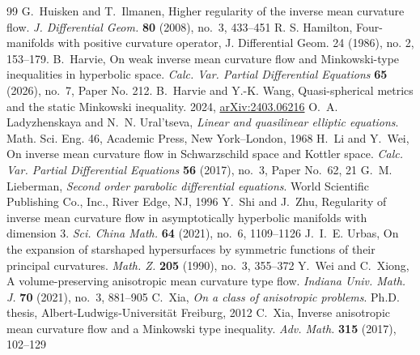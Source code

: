 \documentclass[10pt,a4paper]{amsart}
\providecommand{\arxiv}[1]{\href{https://arxiv.org/abs/#1}{arXiv:#1}}
\numberwithin{equation}{section}
\begin{document}
\begin{thebibliography}{99}
 G.~Huisken and T.~Ilmanen, Higher regularity of the inverse mean curvature flow. \emph{J. Differential Geom.} \textbf{80} (2008), no.~3, 433--451 
 R. S. Hamilton, Four-manifolds with positive curvature operator, J. Differential Geom. 24 (1986), no. 2, 153--179.
 B.~Harvie, On weak inverse mean curvature flow and Minkowski-type inequalities in hyperbolic space. \emph{Calc. Var. Partial Differential Equations} \textbf{65} (2026), no.~7, Paper No. 212.
 B.~Harvie and Y.-K. Wang, Quasi-spherical metrics and the static Minkowski inequality. 2024, \arxiv{2403.06216}
 O.~A. Ladyzhenskaya and N.~N. Ural'tseva, \emph{Linear and quasilinear elliptic equations}. Math. Sci. Eng. 46, Academic Press, New York--London, 1968
 H.~Li and Y.~Wei, On inverse mean curvature flow in Schwarzschild space and Kottler space. \emph{Calc. Var. Partial Differential Equations} \textbf{56} (2017), no.~3, Paper No.~62, 21 
 G.~M. Lieberman, \emph{Second order parabolic differential equations}. World Scientific Publishing Co., Inc., River Edge, NJ, 1996
 Y.~Shi and J.~Zhu, Regularity of inverse mean curvature flow in asymptotically hyperbolic manifolds with dimension 3. \emph{Sci. China Math.} \textbf{64} (2021), no.~6, 1109--1126 
 J.~I.~E. Urbas, On the expansion of starshaped hypersurfaces by symmetric functions of their principal curvatures. \emph{Math. Z.} \textbf{205} (1990), no.~3, 355--372 
 Y.~Wei and C.~Xiong, A volume-preserving anisotropic mean curvature type flow. \emph{Indiana Univ. Math. J.} \textbf{70} (2021), no.~3, 881--905 
 C.~Xia, \emph{On a class of anisotropic problems}. Ph.D. thesis, Albert-Ludwigs-Universit\"at Freiburg, 2012
 C.~Xia, Inverse anisotropic mean curvature flow and a Minkowski type inequality. \emph{Adv. Math.} \textbf{315} (2017), 102--129 
\end{thebibliography}
\end{document}
